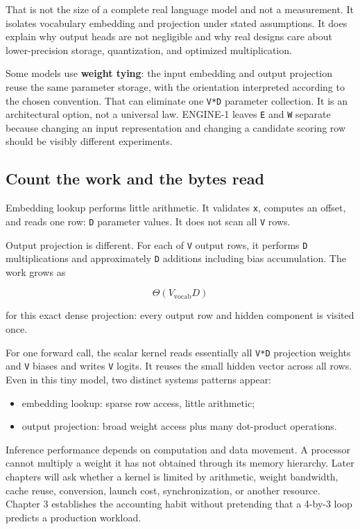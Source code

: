 \documentclass[
  10pt,
]{article}
\providecommand{\tightlist}{%
  \setlength{\itemsep}{0pt}\setlength{\parskip}{0pt}}
\begin{document}
That is not the size of a complete real language model and not a
measurement. It isolates vocabulary embedding and projection under
stated assumptions. It does explain why output heads are not negligible
and why real designs care about lower-precision storage, quantization,
and optimized multiplication.

Some models use \textbf{weight tying}: the input embedding and output
projection reuse the same parameter storage, with the orientation
interpreted according to the chosen convention. That can eliminate one
\texttt{V*D} parameter collection. It is an architectural option, not a
universal law. ENGINE-1 leaves \texttt{E} and \texttt{W} separate
because changing an input representation and changing a candidate
scoring row should be visibly different experiments.

\subsection{Count the work and the bytes
read}\label{count-the-work-and-the-bytes-read}

Embedding lookup performs little arithmetic. It validates \texttt{x},
computes an offset, and reads one row: \texttt{D} parameter values. It
does not scan all \texttt{V} rows.

Output projection is different. For each of \texttt{V} output rows, it
performs \texttt{D} multiplications and approximately \texttt{D}
additions including bias accumulation. The work grows as

\[
\Theta\!\left(V_{\mathrm{vocab}}D\right)
\]

for this exact dense projection: every output row and hidden component
is visited once.

For one forward call, the scalar kernel reads essentially all
\texttt{V*D} projection weights and \texttt{V} biases and writes
\texttt{V} logits. It reuses the small hidden vector across all rows.
Even in this tiny model, two distinct systems patterns appear:

\begin{itemize}
\tightlist
\item
  embedding lookup: sparse row access, little arithmetic;
\item
  output projection: broad weight access plus many dot-product
  operations.
\end{itemize}

Inference performance depends on computation and data movement. A
processor cannot multiply a weight it has not obtained through its
memory hierarchy. Later chapters will ask whether a kernel is limited by
arithmetic, weight bandwidth, cache reuse, conversion, launch cost,
synchronization, or another resource. Chapter 3 establishes the
accounting habit without pretending that a 4-by-3 loop predicts a
production workload.
\end{document}
